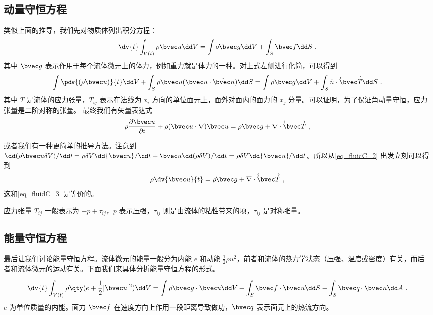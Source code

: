 \subsection{动量守恒方程}
类似上面的推导，我们先对物质体列出积分方程：
\begin{equation}\label{eq_fluidC_2}
\dv{t}\int_{V(t)} \rho \bvec u \dd V=\int \rho \bvec g\dd V+\int_S \bvec f\dd S~.
\end{equation}
其中 $\bvec g$ 表示作用于每个流体微元上的体力，例如重力就是体力的一种。对上式左侧进行化简，可以得到
\begin{equation}
\int \pdv{(\rho \bvec u)}{t}\dd V+\int_S\rho \bvec u (\bvec u\cdot \hat{\bvec n})\dd S=\int \rho\bvec g\dd V+\int_S \hat n\cdot \overleftrightarrow {\bvec T}\dd S~.
\end{equation}
其中 $T$ 是流体的应力张量，$T_{ij}$ 表示在法线为 $x_i$ 方向的单位面元上，面外对面内的面力的 $x_j$ 分量。可以证明，为了保证角动量守恒，应力张量是二阶对称的张量。
最终我们有矢量表达式
\begin{equation}\label{eq_fluidC_3}
\rho \frac{\partial \bvec u}{\partial t}+\rho(\bvec u\cdot \nabla)\bvec u=\rho \bvec g+\nabla\cdot \overleftrightarrow {\bvec T}~,
\end{equation}

或者我们有一种更简单的推导方法。注意到 $\dd(\rho \bvec u \delta V)/\dd t=\rho \delta V \dd {\bvec u}/\dd t+\bvec u \dd (\rho \delta V)/\dd t=\rho \delta V \dd {\bvec u}/\dd t$。所以从\autoref{eq_fluidC_2} 出发立刻可以得到
\begin{equation}
\rho \dv{\bvec u}{t}=\rho \bvec g+\nabla\cdot \overleftrightarrow {\bvec T}~,
\end{equation}
这和\autoref{eq_fluidC_3} 是等价的。

应力张量 $T_{ij}$ 一般表示为 $-p+\tau_{ij}$，$p$ 表示压强，$\tau_{ij}$ 则是由流体的粘性带来的项，$\tau_{ij}$ 是对称张量。

\subsection{能量守恒方程}
最后让我们讨论能量守恒方程。流体微元的能量一般分为内能 $e$ 和动能 $\frac{1}{2}\rho u^2$，前者和流体的热力学状态（压强、温度或密度）有关，而后者和流体微元的运动有关。下面我们来具体分析能量守恒方程的形式。

\begin{equation}
\dv{t} \int_{V(t)} \rho\qty(e+\frac{1}{2}|\bvec u|^2)\dd V=\int \rho \bvec g\cdot \bvec u \dd V+\int_S \bvec f\cdot \bvec u \dd S -\int_S \bvec q\cdot \bvec n\dd A~.
\end{equation}
$e$ 为单位质量的内能。面力 $\bvec f$ 在速度方向上作用一段距离导致做功，$\bvec q$ 表示面元上的热流方向。

